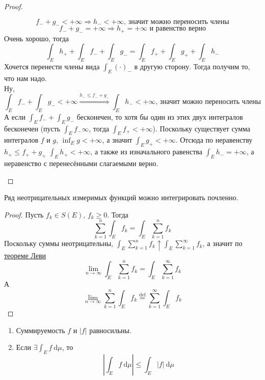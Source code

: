 \documentclass{article}
\begin{document}
\begin{proof}
\begin{enumerate}
            $$
            f_-+g_-<+\infty\Rightarrow h_-<+\infty\text{, значит можно переносить члены}
            $$
            $$
            f_-+g_-=+\infty\Rightarrow h_+=+\infty\text{ и равенство верно}
            $$
            Очень хорошо, тогда
            $$
            \int_Eh_++\int_Ef_-+\int_Eg_-=\int_Ef_++\int_Eg_++\int_Eh_-
            $$
            Хочется перенести члены вида $\int_E{(\cdot)}_-$ в другую сторону. Тогда получим то, что нам надо.\\
            Ну,
            $$
            \int_Ef_-+\int_Eg_-<+\infty\overset{h_-\leqslant f_-+g_-}\Longrightarrow\int_E h_-<+\infty\text{, значит можно переносить члены}
            $$
            А если $\int_E f_-+\int_Eg_-$ бесконечен, то хотя бы один из этих двух интегралов бесконечен (пусть $\int_Ef_-\infty$, тогда $\int_Ef_+<+\infty$). Поскольку существует сумма интегралов $f$ и $g$, $\inf_Eg<+\infty$, а значит $\int_Eg_+<+\infty$. Отсюда по неравенству $h_+\leqslant f_++g_+$ $\int_Eh_+<+\infty$, а также из изначального равенства $\int_E h_-=+\infty$, а неравенство с перенесёнными слагаемыми верно.
        \end{enumerate}
    \end{proof}
    \begin{corollary}
        \label{Теорема Леви для рядов}
        Ряд неотрицательных измеримых функций можно интегрировать почленно.
    \end{corollary}
    \begin{proof}
        Пусть $f_k\in S(E)$, $f_k\geqslant0$. Тогда
        $$
        \sum\limits_{k=1}^n\int_Ef_k=\int_E\sum\limits_{k=1}^nf_k
        $$
        Поскольку суммы неотрицательны, $\int_E\sum\limits_{k=1}^nf_k\uparrow\int_E\sum\limits_{k=1}^\infty f_k$, а значит по \hyperref[Теорема Леви]{теореме Леви}
        $$
        \lim\limits_{n\to\infty}\int_E\sum\limits_{k=1}^nf_k=\int_E\sum\limits_{k=1}^\infty f_k
        $$
        А
        $$
        \lim\limits_{n\to\infty}\sum\limits_{k=1}^n\int_Ef_k\overset{\mathrm{def}}=\sum\limits_{k=1}^\infty\int_Ef_k
        $$
    \end{proof}
    \begin{corollary}
        \begin{enumerate}
            \item Суммируемость $f$ и $|f|$ равносильны.
            \item Если $\exists\int_E f~\mathrm d\mu$, то
            $$
            \left|\int_E f~\mathrm d\mu\right|\leqslant\int_E |f|~\mathrm d\mu
            $$
        \end{enumerate}
    \end{corollary}
\end{document}
